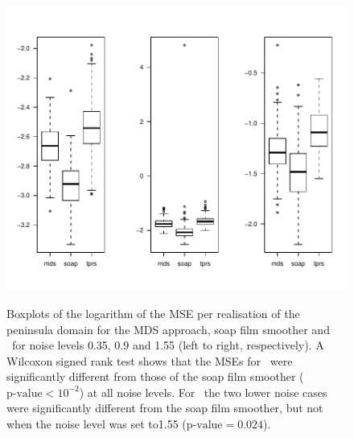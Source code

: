 \begin{figure}
\centering
\includegraphics[width=6in, trim=0in 0.5in 0in 0in]{mds/figs/mds-wt2-boxplot.pdf} \\
\caption{Boxplots of the logarithm of the MSE per realisation of the peninsula domain for the MDS approach, soap film smoother and \tprs\ for noise levels 0.35, 0.9 and 1.55 (left to right, respectively). A Wilcoxon signed rank test shows that the MSEs for \tprs\ were significantly different from those of the soap film smoother ($\text{p-value} < 10^{-2}$) at all noise levels. For \mdsap\ the two lower noise cases were significantly different from the soap film smoother, but not when the noise level was set to1.55 ($\text{p-value} = 0.024$).}
\label{mds-wt2-boxplot}
\end{figure}

